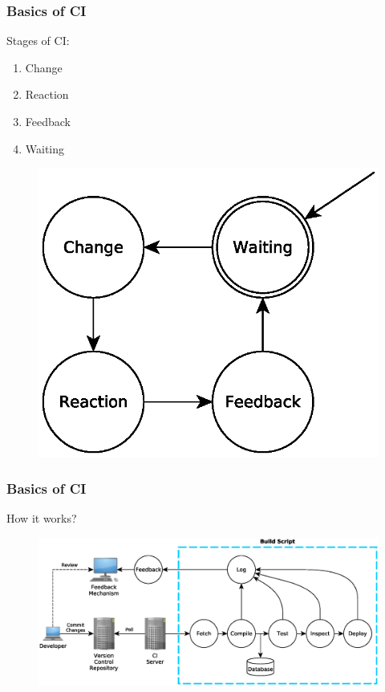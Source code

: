\documentclass[10pt,xcolor=pdflatex]{beamer}
\begin{document}
\begin{frame}\frametitle{Basics of CI}
    \begin{multicols}{2}
        Stages of CI:
        \begin{enumerate}
            \item Change
            \item Reaction
            \item Feedback
            \item Waiting 
        \end{enumerate}
        \begin{figure}[H]
            \centering
            \includegraphics[scale=0.5]{eps/stages_of_ci.eps}
        \end{figure}
    \end{multicols}
\end{frame}

\begin{frame}\frametitle{Basics of CI}
    \begin{centering}
        \large{How it works?}\\[1em]
    \end{centering}
    \begin{figure}[H]
        \centering
        \hspace{-1.7em} \includegraphics[scale=0.4]{eps/build_script.eps}
    \end{figure}
\end{frame}
\end{document}
